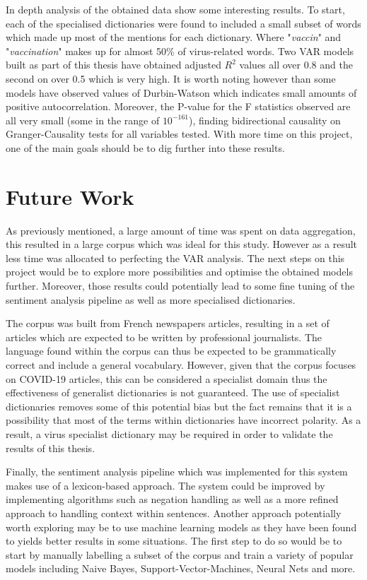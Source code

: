 In depth analysis of the obtained data show some interesting results. To start, each of the specialised dictionaries were found to included a small subset of words which made up most of the mentions for each dictionary. Where "\emph{vaccin}" and "\emph{vaccination}" makes up for almost 50\% of virus-related words. Two VAR models built as part of this thesis have obtained adjusted $R^2$ values all over 0.8 and the second on over 0.5 which is very high. It is worth noting however than some models have observed values of Durbin-Watson which indicates small amounts of positive autocorrelation. Moreover, the P-value for the F statistics observed are all very small (some in the range of $10^{-161}$), finding bidirectional causality on Granger-Causality tests for all variables tested. With more time on this project, one of the main goals should be to dig further into these results.

\section{Future Work}

As previously mentioned, a large amount of time was spent on data aggregation, this resulted in a large corpus which was ideal for this study. However as a result less time was allocated to perfecting the VAR analysis. The next steps on this project would be to explore more possibilities and optimise the obtained models further. Moreover, those results could potentially lead to some fine tuning of the sentiment analysis pipeline as well as more specialised dictionaries.

The corpus was built from French newspapers articles, resulting in a set of articles which are expected to be written by professional journalists. The language found within the corpus can thus be expected to be grammatically correct and include a general vocabulary. However, given that the corpus focuses on COVID-19 articles, this can be considered a specialist domain thus the effectiveness of generalist dictionaries is not guaranteed. The use of specialist dictionaries removes some of this potential bias but the fact remains that it is a possibility that most of the terms within dictionaries have incorrect polarity. As a result, a virus specialist dictionary may be required in order to validate the results of this thesis.

Finally, the sentiment analysis pipeline which was implemented for this system makes use of a lexicon-based approach. The system could be improved by implementing algorithms such as negation handling as well as a more refined approach to handling context within sentences. Another approach potentially worth exploring may be to use machine learning models as they have been found to yields better results in some situations. The first step to do so would be to start by manually labelling a subset of the corpus and train a variety of popular models including Naive Bayes, Support-Vector-Machines, Neural Nets and more.

